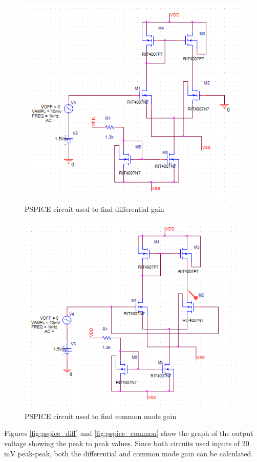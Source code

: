 \documentclass[11pt]{article}
\begin{document}
	\begin{figure}[H]
		\centering
		\includegraphics[width=4.0 in]{diff_gain_circuit.png}
		\caption{PSPICE circuit used to find differential gain}
		\label{fig:diff_gain_circuit}
	\end{figure}

	\begin{figure}[H]
		\centering
		\includegraphics[width=4.0 in]{common_gain_circuit.png}
		\caption{PSPICE circuit used to find common mode gain}
		\label{fig:common_gain_circuit}
	\end{figure}

	Figures \ref{fig:pspice_diff} and \ref{fig:pspice_common} show the graph
	of the output voltage showing the peak to peak values. Since both circuits
	used inputs of 20 $\si{\milli\volt}$ peak-peak, both the differential and
	common mode gain can be calculated.
\end{document}
